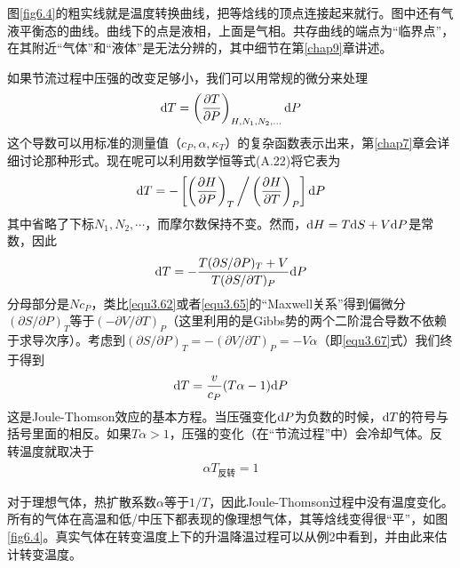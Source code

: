 图\ref{fig6.4}的粗实线就是温度转换曲线，把等焓线的顶点连接起来就行。图中还有气液平衡态的曲线。曲线下的点是液相，上面是气相。共存曲线的端点为“临界点”，在其附近“气体”和“液体”是无法分辨的，其中细节在第\ref{chap9}章讲述。

如果节流过程中压强的改变足够小，我们可以用常规的微分来处理
\begin{align}\label{equ6.38}
	\mathrm{d} T = \left( \frac{\partial T}{\partial P} \right)_{H, N_1, N_2, \dots } \mathrm{d} P
\end{align}
这个导数可以用标准的测量值（$c_P, \alpha, \kappa_T$）的复杂函数表示出来，第\ref{chap7}章会详细讨论那种形式。现在呢可以利用数学恒等式(A.22)将它表为
\begin{align}\label{equ6.39}
	\mathrm{d} T = -\left[ \left( \frac{\partial H}{\partial P} \right)_T \bigg/ \left( \frac{ \partial H}{\partial T} \right)_P \right] \mathrm{d} P
\end{align}
其中省略了下标$N_1, N_2,\cdots$，而摩尔数保持不变。然而，$\mathrm{d} H = T \mathrm{d} S + V \mathrm{d} P$是常数，因此
\begin{align}\label{equ6.40}
	\mathrm{d} T = -\frac{ T (\partial S/\partial P)_T + V}{T(\partial S/\partial T)_P} \mathrm{d} P
\end{align}
分母部分是$N c_P$，类比\eqref{equ3.62}或者\eqref{equ3.65}的“Maxwell关系”得到偏微分$(\partial S/\partial P)_T$等于$(-\partial V/\partial T)_P$（这里利用的是Gibbs势的两个二阶混合导数不依赖于求导次序）。考虑到$(\partial S/\partial P)_T=-(\partial V/\partial T)_P=-V\alpha$（即\eqref{equ3.67}式）我们终于得到
\begin{align}\label{equ6.41}
	\mathrm{d} T = \frac{v}{c_P}(T\alpha-1) \mathrm{d} P
\end{align}
这是Joule-Thomson效应的基本方程。当压强变化$\mathrm{d} P$为负数的时候，$\mathrm{d} T$的符号与括号里面的相反。如果$T\alpha>1$，压强的变化（在“节流过程”中）会冷却气体。反转温度就取决于
\begin{align}\label{equ6.42}
	\alpha T_{\text{反转}} = 1
\end{align}

对于理想气体，热扩散系数$\alpha$等于$1/T$，因此Joule-Thomson过程中没有温度变化。所有的气体在高温和低/中压下都表现的像理想气体，其等焓线变得很“平”，如图\ref{fig6.4}。真实气体在转变温度上下的升温降温过程可以从例2中看到，并由此来估计转变温度。

